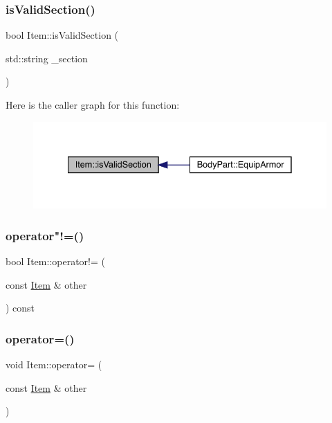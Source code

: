 \subsubsection{\texorpdfstring{is\+Valid\+Section()}{isValidSection()}}
{\footnotesize\ttfamily bool Item\+::is\+Valid\+Section (\begin{DoxyParamCaption}\item[{std\+::string}]{\+\_\+section }\end{DoxyParamCaption})}

Here is the caller graph for this function\+:
\nopagebreak
\begin{figure}[H]
\begin{center}
\leavevmode
\includegraphics[width=335pt]{dc/d32/class_item_a10dd503844c230e3d3bf890e969af867_icgraph}
\end{center}
\end{figure}
\mbox{\label{class_item_a612c595b62d2f7b9c5cd2b085a14b365}} 
\subsubsection{\texorpdfstring{operator"!=()}{operator!=()}}
{\footnotesize\ttfamily bool Item\+::operator!= (\begin{DoxyParamCaption}\item[{const \mbox{\hyperlink{class_item}{Item}} \&}]{other }\end{DoxyParamCaption}) const}

\mbox{\label{class_item_a47267a43bfae3f28e183170f45783da5}} 
\subsubsection{\texorpdfstring{operator=()}{operator=()}}
{\footnotesize\ttfamily void Item\+::operator= (\begin{DoxyParamCaption}\item[{const \mbox{\hyperlink{class_item}{Item}} \&}]{other }\end{DoxyParamCaption})}

